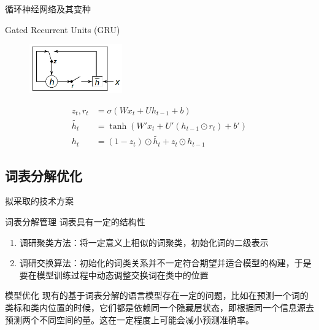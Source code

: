\documentclass[14pt]{Bredelebeamer}
\begin{document}
\begin{frame}{循环神经网络及其变种}
\begin{block}{Gated Recurrent Units (GRU)}
        \begin{figure}[H]
    \begin{minipage}{0.4\linewidth}
    \centerline{\includegraphics[width=4.0cm]{images/gru.png}}
    \end{minipage}
    \hfill
    \begin{minipage}{.5\linewidth}
    \begin{displaymath} %
    \begin{array}{rl}
        {z_t, r_t} &= \sigma(W x_t + U h_{t-1} + b) \\
        \tilde{h_t} &= \tanh(W' x_t + U' (h_{t-1} \odot r_t) + b') \\
        h_t &= (1 - z_t) \odot \tilde{h_t} + z_t \odot h_{t-1}
    \end{array}
    \end{displaymath}
    \end{minipage}
    \label{lstm}
    \end{figure}
    
    
    \end{block}
\end{frame}

\subsection{词表分解优化}
\begin{frame}{拟采取的技术方案}
\begin{block}{词表分解管理}
词表具有一定的结构性
\begin{enumerate}
\item 调研聚类方法：将一定意义上相似的词聚类，初始化词的二级表示
\item 调研交换算法：初始化的词类关系并不一定符合期望并适合模型的构建，于是要在模型训练过程中动态调整交换词在类中的位置
\end{enumerate}
\end{block}
\begin{block}{模型优化}
现有的基于词表分解的语言模型存在一定的问题，比如在预测一个词的类标和类内位置的时候，它们都是依赖同一个隐藏层状态，即根据同一个信息源去预测两个不同空间的量。这在一定程度上可能会减小预测准确率。
\end{block}
\end{frame}
\end{document}
